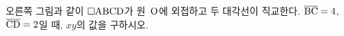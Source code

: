 \noindent\begin{minipage}[t]{0.58\linewidth}\vspace{0pt}\raggedright 오른쪽 그림과 같이 $\square\mathrm{ABCD}$가 원~$\mathrm{O}$에 외접하고 두 대각선이 직교한다. $\overline{\mathrm{BC}}=4$, $\overline{\mathrm{CD}}=2$일 때, $xy$의 값을 구하시오.\end{minipage}\hfill\begin{minipage}[t]{0.4\linewidth}\vspace{0pt}\centering \resizebox{\ifdim\width>\linewidth\linewidth\else\width\fi}{!}{}\end{minipage}\par

